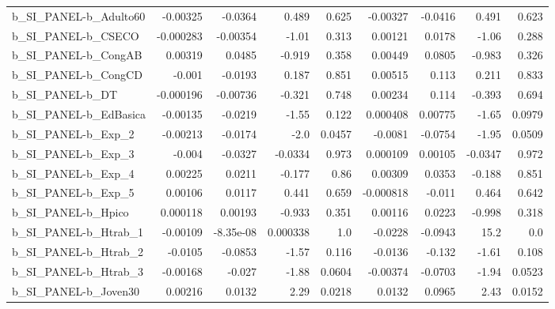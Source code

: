 \begin{tabular}{lrrrrrrrr}
b\_SI\_PANEL-b\_Adulto60      &    -0.00325 &      -0.0364 &     0.489 &    0.625 &   -0.00327 &     -0.0416 &        0.491 &         0.623 \\
b\_SI\_PANEL-b\_CSECO         &   -0.000283 &     -0.00354 &     -1.01 &    0.313 &    0.00121 &      0.0178 &        -1.06 &         0.288 \\
b\_SI\_PANEL-b\_CongAB        &     0.00319 &       0.0485 &    -0.919 &    0.358 &    0.00449 &      0.0805 &       -0.983 &         0.326 \\
b\_SI\_PANEL-b\_CongCD        &      -0.001 &      -0.0193 &     0.187 &    0.851 &    0.00515 &       0.113 &        0.211 &         0.833 \\
b\_SI\_PANEL-b\_DT            &   -0.000196 &     -0.00736 &    -0.321 &    0.748 &    0.00234 &       0.114 &       -0.393 &         0.694 \\
b\_SI\_PANEL-b\_EdBasica      &    -0.00135 &      -0.0219 &     -1.55 &    0.122 &   0.000408 &     0.00775 &        -1.65 &        0.0979 \\
b\_SI\_PANEL-b\_Exp\_2         &    -0.00213 &      -0.0174 &      -2.0 &   0.0457 &    -0.0081 &     -0.0754 &        -1.95 &        0.0509 \\
b\_SI\_PANEL-b\_Exp\_3         &      -0.004 &      -0.0327 &   -0.0334 &    0.973 &   0.000109 &     0.00105 &      -0.0347 &         0.972 \\
b\_SI\_PANEL-b\_Exp\_4         &     0.00225 &       0.0211 &    -0.177 &     0.86 &    0.00309 &      0.0353 &       -0.188 &         0.851 \\
b\_SI\_PANEL-b\_Exp\_5         &     0.00106 &       0.0117 &     0.441 &    0.659 &  -0.000818 &      -0.011 &        0.464 &         0.642 \\
b\_SI\_PANEL-b\_Hpico         &    0.000118 &      0.00193 &    -0.933 &    0.351 &    0.00116 &      0.0223 &       -0.998 &         0.318 \\
b\_SI\_PANEL-b\_Htrab\_1       &    -0.00109 &    -8.35e-08 &  0.000338 &      1.0 &    -0.0228 &     -0.0943 &         15.2 &           0.0 \\
b\_SI\_PANEL-b\_Htrab\_2       &     -0.0105 &      -0.0853 &     -1.57 &    0.116 &    -0.0136 &      -0.132 &        -1.61 &         0.108 \\
b\_SI\_PANEL-b\_Htrab\_3       &    -0.00168 &       -0.027 &     -1.88 &   0.0604 &   -0.00374 &     -0.0703 &        -1.94 &        0.0523 \\
b\_SI\_PANEL-b\_Joven30       &     0.00216 &       0.0132 &      2.29 &   0.0218 &     0.0132 &      0.0965 &         2.43 &        0.0152 \\

\end{tabular}
